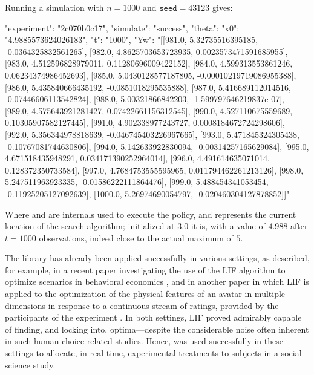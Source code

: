 \documentclass[nojss]{jss}
\begin{document}
Running a simulation with $n=1000$ and $\texttt{seed}=43123$ gives:
\begin{Code}
{
    "experiment": "2c070b0c17",
    "simulate": "success",
    "theta": {
        "x0": "4.9885573624026183",
        "t": "1000",
        "Yw": 
        "[[981.0, 5.32735516395185, -0.0364325832561265], 
        [982.0, 4.8625703653723935, 0.0023573471591685955], 
        [983.0, 4.512596828979011, 0.11280696009422152], 
        [984.0, 4.599313553861246, 0.06234374986452693], 
        [985.0, 5.0430128577187805, -0.00010219719086955388], 
        [986.0, 5.435840666435192, -0.0851018295535888], 
        [987.0, 5.416689112014516, -0.07446606113542824], 
        [988.0, 5.00321866842203, -1.599797646219837e-07], 
        [989.0, 4.575643921281427, 0.07422661156312545], 
        [990.0, 4.527110675559689, 0.10305907582127445], 
        [991.0, 4.902338977243727, 0.0008184672724298606], 
        [992.0, 5.356344978818639, -0.046745403226967665], 
        [993.0, 5.471845324305438, -0.10767081744630806], 
        [994.0, 5.142633922830094, -0.00314257165629084], 
        [995.0, 4.671518435948291, 0.034171390252964014], 
        [996.0, 4.491614635071014, 0.128372350733584], 
        [997.0, 4.7684753555595965, 0.011794462261213126], 
        [998.0, 5.247511963923335, -0.01586222111864476], 
        [999.0, 5.488454341053454, -0.11925205127092639], 
        [1000.0, 5.26974690054797, -0.020460304127878852]]"
    }
}
\end{Code}
Where  and  are internals used to execute the policy, and  represents the current location of the search algorithm; initialized at $3.0$ it is, with a value of $4.988$ after $t=1000$ observations, indeed close to the actual maximum of $5$.

The  library has already been applied successfully in various settings, as described, for example, in a recent paper investigating the use of the LIF algorithm to optimize scenarios in behavioral economics \citep{kaptein2016tracking}, and in another paper in which LIF is applied to the optimization of the physical features of an avatar in multiple dimensions in response to a continuous stream of ratings, provided by the participants of the experiment \citep{kaptein2016investigation}. In both settings, LIF proved admirably capable of finding, and locking into, optima---despite the considerable noise often inherent in such human-choice-related studies. Hence,  was used successfully in these settings to allocate, in real-time, experimental treatments to subjects in a social-science study.
\end{document}
